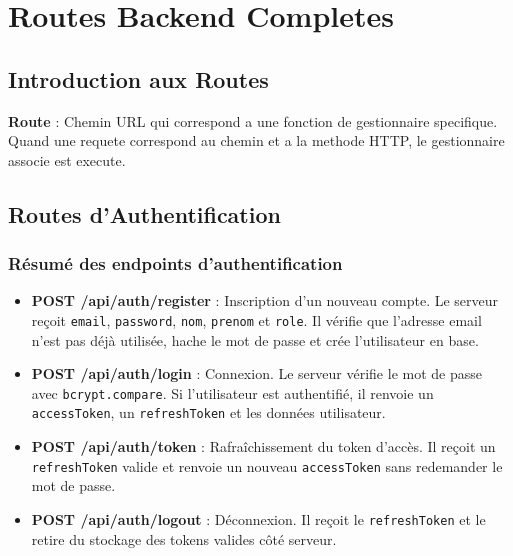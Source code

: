 \documentclass[a4paper,12pt]{book}
\begin{document}
\chapter{Routes Backend Completes}

\section{Introduction aux Routes}

\begin{definitionbox}
    \textbf{Route} : Chemin URL qui correspond a une fonction de gestionnaire specifique. Quand une requete correspond au chemin et a la methode HTTP, le gestionnaire associe est execute.
\end{definitionbox}

\section{Routes d'Authentification}

\subsection{Résumé des endpoints d'authentification}
\begin{itemize}
    \item \textbf{POST /api/auth/register} : Inscription d'un nouveau compte. Le serveur reçoit \texttt{email}, \texttt{password}, \texttt{nom}, \texttt{prenom} et \texttt{role}. Il vérifie que l'adresse email n'est pas déjà utilisée, hache le mot de passe et crée l'utilisateur en base.
    \item \textbf{POST /api/auth/login} : Connexion. Le serveur vérifie le mot de passe avec \texttt{bcrypt.compare}. Si l'utilisateur est authentifié, il renvoie un \texttt{accessToken}, un \texttt{refreshToken} et les données utilisateur.
    \item \textbf{POST /api/auth/token} : Rafraîchissement du token d'accès. Il reçoit un \texttt{refreshToken} valide et renvoie un nouveau \texttt{accessToken} sans redemander le mot de passe.
    \item \textbf{POST /api/auth/logout} : Déconnexion. Il reçoit le \texttt{refreshToken} et le retire du stockage des tokens valides côté serveur.
\end{itemize}
\end{document}
